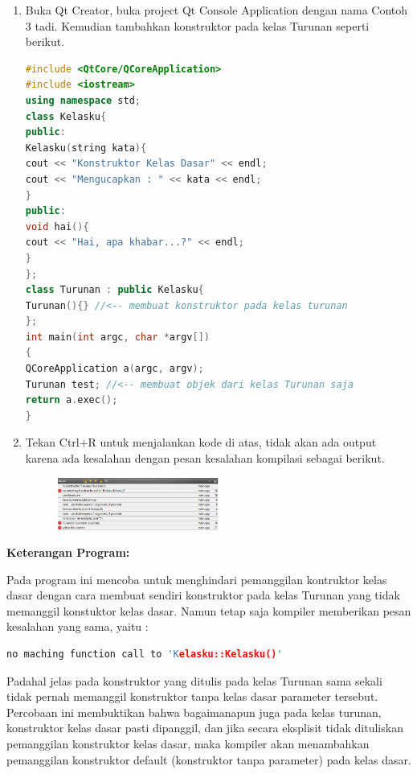 \begin{enumerate}
\def\labelenumi{\arabic{enumi}.}
\item
  Buka Qt Creator, buka project Qt Console Application dengan nama
  Contoh 3 tadi. Kemudian tambahkan konstruktor pada kelas Turunan
  seperti berikut.

\begin{lstlisting}[language=c++]
#include <QtCore/QCoreApplication>
#include <iostream>
using namespace std;
class Kelasku{
public:
Kelasku(string kata){
cout << "Konstruktor Kelas Dasar" << endl;
cout << "Mengucapkan : " << kata << endl;
}
public:
void hai(){
cout << "Hai, apa khabar...?" << endl;
}
};
class Turunan : public Kelasku{
Turunan(){} //<-- membuat konstruktor pada kelas turunan
};
int main(int argc, char *argv[])
{
QCoreApplication a(argc, argv);
Turunan test; //<-- membuat objek dari kelas Turunan saja
return a.exec();
}
\end{lstlisting}
\item
  Tekan Ctrl+R untuk menjalankan kode di atas, tidak akan ada output
  karena ada kesalahan dengan pesan kesalahan kompilasi sebagai berikut.
  
  \begin{figure}[htbp]
  	\centering
  	\includegraphics[width=0.5\textwidth]{images/capture7-3.png}
  	
  \end{figure}
\end{enumerate}



\textbf{Keterangan Program:}

Pada program ini mencoba untuk menghindari pemanggilan kontruktor kelas
dasar dengan cara membuat sendiri konstruktor pada kelas Turunan yang
tidak memanggil konstuktor kelas dasar. Namun tetap saja kompiler
memberikan pesan kesalahan yang sama, yaitu :

\begin{lstlisting}[language=c++]
    no maching function call to 'Kelasku::Kelasku()' 
\end{lstlisting}

Padahal jelas pada konstruktor yang ditulis pada kelas Turunan sama
sekali tidak pernah memanggil konstruktor tanpa kelas dasar parameter
tersebut. Percobaan ini membuktikan bahwa bagaimanapun juga pada kelas
turunan, konstruktor kelas dasar pasti dipanggil, dan jika secara
eksplisit tidak dituliskan pemanggilan konstruktor kelas dasar, maka
kompiler akan menambahkan pemanggilan konstruktor default (konstruktor
tanpa parameter) pada kelas dasar.

